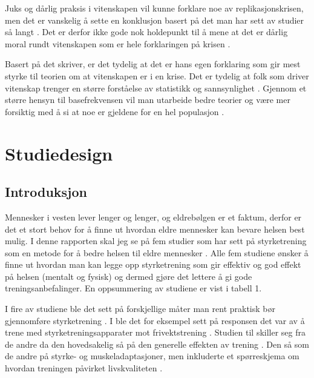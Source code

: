 \documentclass[
]{book}
\begin{document}
Juks og dårlig praksis i vitenskapen vil kunne forklare noe av replikasjonskrisen, men det er vanskelig å sette en konklusjon basert på det man har sett av studier så langt \citep{bird2020}. Det er derfor ikke gode nok holdepunkt til å mene at det er dårlig moral rundt vitenskapen som er hele forklaringen på krisen \citep{bird2020}.

Basert på det \citet{bird2020} skriver, er det tydelig at det er hans egen forklaring som gir mest styrke til teorien om at vitenskapen er i en krise. Det er tydelig at folk som driver vitenskap trenger en større forståelse av statistikk og sannsynlighet \citep{bird2020}. Gjennom et større hensyn til basefrekvensen vil man utarbeide bedre teorier og være mer forsiktig med å si at noe er gjeldene for en hel populasjon \citep{bird2020}.

\hypertarget{studiedesign}{%
\chapter{Studiedesign}\label{studiedesign}}

\hypertarget{introduksjon-1}{%
\section{Introduksjon}\label{introduksjon-1}}

Mennesker i vesten lever lenger og lenger, og eldrebølgen er et faktum, derfor er det et stort behov for å finne ut hvordan eldre mennesker kan bevare helsen best mulig. I denne rapporten skal jeg se på fem studier som har sett på styrketrening som en metode for å bedre helsen til eldre mennesker \citep{geirsdottir2012, schott2019, turpela2017, vikberg2019, vincent2002}. Alle fem studiene ønsker å finne ut hvordan man kan legge opp styrketrening som gir effektiv og god effekt på helsen (mentalt og fysisk) og dermed gjøre det lettere å gi gode treningsanbefalinger. En oppsummering av studiene er vist i tabell 1.

I fire av studiene ble det sett på forskjellige måter man rent praktisk bør gjennomføre styrketrening \citetext{\citealp[ ]{schott2019}; \citealp{turpela2017}; \citealp{vikberg2019}; \citealp{vincent2002}}. I \citet{schott2019} ble det for eksempel sett på responsen det var av å trene med styrketreningsapparater mot frivektstrening \citep{schott2019}. Studien til \citet{geirsdottir2012} skiller seg fra de andre da den hovedsakelig så på den generelle effekten av trening \citep{geirsdottir2012}. Den så som de andre på styrke- og muskeladaptasjoner, men inkluderte et spørreskjema om hvordan treningen påvirket livskvaliteten \citep{geirsdottir2012}.
\end{document}
